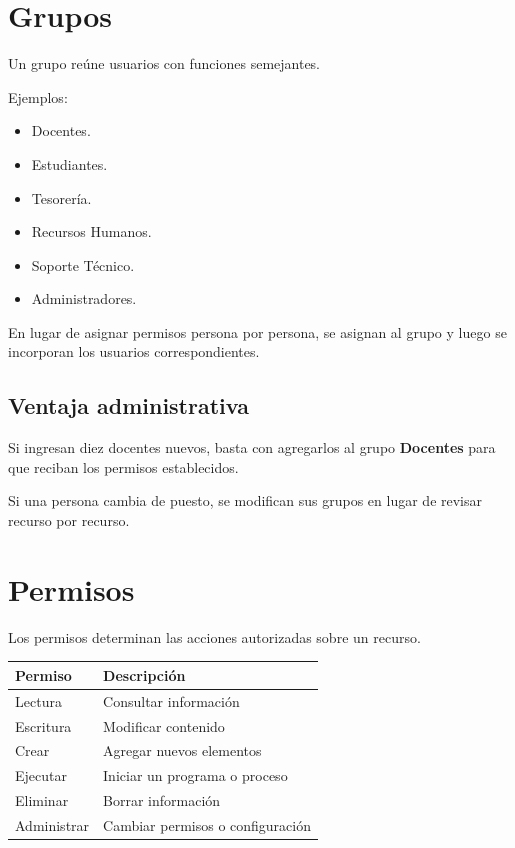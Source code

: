 \documentclass[
  spanish,
  letterpaper,
]{scrbook}
\newcounter{none} %
\providecommand{\tightlist}{%
  \setlength{\itemsep}{0pt}\setlength{\parskip}{0pt}}
\begin{document}

\chapter{Grupos}\label{grupos}

Un grupo reúne usuarios con funciones semejantes.

Ejemplos:

\begin{itemize}
\tightlist
\item
  Docentes.
\item
  Estudiantes.
\item
  Tesorería.
\item
  Recursos Humanos.
\item
  Soporte Técnico.
\item
  Administradores.
\end{itemize}

En lugar de asignar permisos persona por persona, se asignan al grupo y
luego se incorporan los usuarios correspondientes.

\section{Ventaja administrativa}\label{ventaja-administrativa}

Si ingresan diez docentes nuevos, basta con agregarlos al grupo
\textbf{Docentes} para que reciban los permisos establecidos.

Si una persona cambia de puesto, se modifican sus grupos en lugar de
revisar recurso por recurso.


\chapter{Permisos}\label{permisos}

Los permisos determinan las acciones autorizadas sobre un recurso.

{\def\LTcaptype{none} %
\begin{longtable}[]{@{}ll@{}}
\toprule\noalign{}
Permiso & Descripción \\
\midrule\noalign{}
\endhead
\bottomrule\noalign{}
\endlastfoot
Lectura & Consultar información \\
Escritura & Modificar contenido \\
Crear & Agregar nuevos elementos \\
Ejecutar & Iniciar un programa o proceso \\
Eliminar & Borrar información \\
Administrar & Cambiar permisos o configuración \\
\end{longtable}
}
\end{document}

